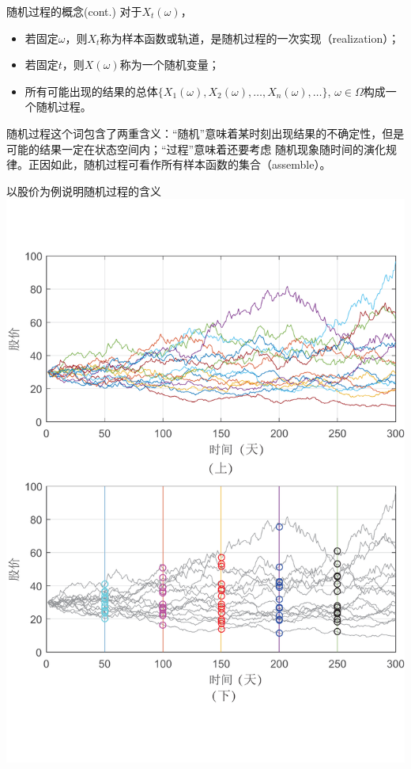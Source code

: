 \documentclass[t]{beamer}
\begin{document}
  \begin{frame}{随机过程的概念(cont.)}
    对于$X_t(\omega)$，
  \begin{itemize}
    \item 若固定$\omega$，则$X_t$称为样本函数或轨道，是随机过程的一次实现（realization）；
    \item 若固定$t$，则$X(\omega)$称为一个随机变量；
    \item 所有可能出现的结果的总体$\{X_1(\omega),X_2(\omega),\ldots,X_n(\omega),\ldots\}$,
    $\omega\in\Omega$构成一个随机过程。
  \end{itemize}

  随机过程这个词包含了两重含义：“随机”意味着某时刻出现结果的不确定性，但是可能的结果一定在状态空间内；“过程”意味着还要考虑
随机现象随时间的演化规律。正因如此，随机过程可看作所有样本函数的集合（assemble）。
  \end{frame}


  \begin{frame}{以股价为例说明随机过程的含义}
  \centering  \includegraphics[scale=.3]{fig/stk.pdf}
  
  \end{frame}
  
\end{document}
